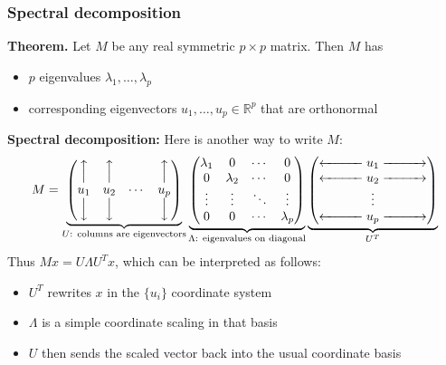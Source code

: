 \documentclass[smaller,handout]{beamer}
\def\R{{\mathbb R}}
\def\darkred{\color{red!70!black}}
\def\v2{{\vskip.2in}}
\def\R{{\mathbb R}}
\begin{document}
\begin{frame}
\frametitle{Spectral decomposition}

{\bf Theorem.} Let $M$ be any real symmetric $p \times p$ matrix. Then $M$ has
\begin{itemize}
\item $p$ eigenvalues $\lambda_1, \ldots, \lambda_p$
\item corresponding eigenvectors $u_1, \ldots, u_p \in \R^p$ that are orthonormal
\end{itemize}

\pause\v2
{\darkred
{\bf Spectral decomposition:} Here is another way to write $M$:
$$ 
M = 
\underbrace{\begin{pmatrix}
\Big\uparrow   & \Big\uparrow   &         & \Big\uparrow \\
u_1            & u_2            &  \cdots & u_p  \\
\Big\downarrow & \Big\downarrow &         & \Big\downarrow
\end{pmatrix}}_{\text{$U$: columns are eigenvectors}}
\underbrace{\begin{pmatrix}
\lambda_1 &      0    & \cdots & 0      \\
0         & \lambda_2 & \cdots & 0      \\
\vdots    &   \vdots  & \ddots & \vdots \\
0         &     0     & \cdots & \lambda_p
\end{pmatrix}}_{\text{$\Lambda$: eigenvalues on diagonal}}
\underbrace{\begin{pmatrix} 
\xleftarrow{\hspace*{1cm}} u_1 \xrightarrow{\hspace*{1cm}} \\
\xleftarrow{\hspace*{1cm}} u_2 \xrightarrow{\hspace*{1cm}} \\
 \vdots \\ 
\xleftarrow{\hspace*{1cm}} u_p \xrightarrow{\hspace*{1cm}} 
\end{pmatrix}}_{U^T}
$$}
\pause
Thus $Mx = U\Lambda U^T x$, which can be interpreted as follows:
\begin{itemize}
\item $U^T$ rewrites $x$ in the $\{u_i\}$ coordinate system
\item $\Lambda$ is a simple coordinate scaling in that basis
\item $U$ then sends the scaled vector back into the usual coordinate basis
\end{itemize}
\end{frame}
\end{document}
